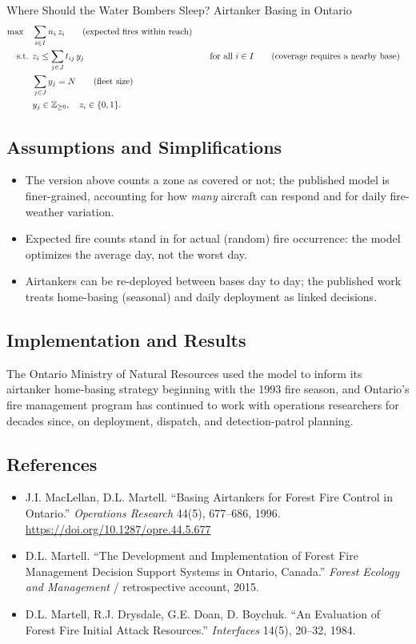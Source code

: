 \begin{casestudybox}{Where Should the Water Bombers Sleep? Airtanker Basing in Ontario}
\begin{align*}
\max \quad & \sum_{i \in I} n_i \, z_i   \tag{expected fires within reach} \\
\text{ s.t. }        & z_i \leq \sum_{j \in J} t_{ij}\, y_j &&\quad \text{for all } i \in I   \tag{coverage requires a nearby base} \\
             & \sum_{j \in J} y_j = N   \tag{fleet size} \\
             & y_j \in \mathbb{Z}_{\geq 0}, \quad z_i \in \{0,1\}.
\end{align*}

\subsection*{Assumptions and Simplifications}
\begin{itemize}
\item The version above counts a zone as covered or not; the published model is finer-grained, accounting for how \emph{many} aircraft can respond and for daily fire-weather variation.
\item Expected fire counts stand in for actual (random) fire occurrence: the model optimizes the average day, not the worst day.
\item Airtankers can be re-deployed between bases day to day; the published work treats home-basing (seasonal) and daily deployment as linked decisions.
\end{itemize}

\subsection*{Implementation and Results}
The Ontario Ministry of Natural Resources used the model to inform its airtanker home-basing strategy beginning with the 1993 fire season, and Ontario's fire management program has continued to work with operations researchers for decades since, on deployment, dispatch, and detection-patrol planning.

\subsection*{References}
\begin{itemize}
\item J.I. MacLellan, D.L. Martell. ``Basing Airtankers for Forest Fire Control in Ontario.'' \emph{Operations Research} 44(5), 677--686, 1996. \url{https://doi.org/10.1287/opre.44.5.677}
\item D.L. Martell. ``The Development and Implementation of Forest Fire Management Decision Support Systems in Ontario, Canada.'' \emph{Forest Ecology and Management} / retrospective account, 2015.
\item D.L. Martell, R.J. Drysdale, G.E. Doan, D. Boychuk. ``An Evaluation of Forest Fire Initial Attack Resources.'' \emph{Interfaces} 14(5), 20--32, 1984.
\end{itemize}
\end{casestudybox}

